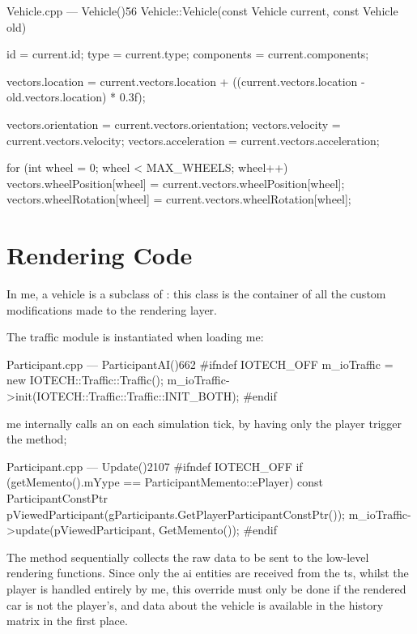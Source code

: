 \begin{codelist}{Vehicle.cpp --- Vehicle()}{56}
Vehicle::Vehicle(const Vehicle current, const Vehicle old) {
    id         = current.id;
    type       = current.type;
    components = current.components;

    vectors.location = current.vectors.location + ((current.vectors.location - old.vectors.location) * 0.3f);

    vectors.orientation  = current.vectors.orientation;
    vectors.velocity     = current.vectors.velocity;
    vectors.acceleration = current.vectors.acceleration;

    for (int wheel = 0; wheel < MAX_WHEELS; wheel++) {
        vectors.wheelPosition[wheel] = current.vectors.wheelPosition[wheel];
        vectors.wheelRotation[wheel] = current.vectors.wheelRotation[wheel];
    }
}
\end{codelist}

\section{Rendering Code}\label{sc:integration:renderingcode}

In \gls{me}, a vehicle is a subclass of : this class is the container of all the custom  modifications made to the rendering layer.

The traffic module is instantiated when loading \gls{me}:

\begin{codelist}{Participant.cpp --- ParticipantAI()}{662}
#ifndef IOTECH_OFF
	m_ioTraffic = new IOTECH::Traffic::Traffic();
	m_ioTraffic->init(IOTECH::Traffic::Traffic::INIT_BOTH);
#endif
\end{codelist}

\FLOATnoindent \gls{me} internally calls an  on each simulation tick, by having only the player  trigger the method;

\begin{codelist}{Participant.cpp --- Update()}{2107}
#ifndef IOTECH_OFF
	if (getMemento().mYype == ParticipantMemento::ePlayer) {
		const ParticipantConstPtr pViewedParticipant(gParticipants.GetPlayerParticipantConstPtr());
		m_ioTraffic->update(pViewedParticipant, GetMemento());
	}
#endif
\end{codelist}

\FLOATnoindent The  method sequentially collects the raw data to be sent to the low-level rendering functions. Since only the \gls{ai} entities are received from the \gls{ts}, whilst the player is handled entirely by \gls{me}, this override must only be done if the rendered car is not the player's, and data about the vehicle is available in the history matrix in the first place.


